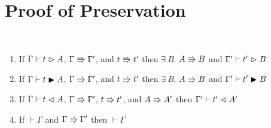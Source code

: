 \chapter{Proof of Preservation}
\label{ap:b}

\begin{lemma}
    \textcolor{white}{\_}
    \begin{enumerate}
        \item If $\Gamma \vdash t \vartriangleright A$, $\Gamma \Rrightarrow \Gamma^\prime$, and $t \Rrightarrow t^\prime$ then $\exists\ B.$ $A \Rrightarrow B$ and $\Gamma^\prime \vdash t^\prime \vartriangleright B$
        \item If $\Gamma \vdash t \blacktriangleright A$, $\Gamma \Rrightarrow \Gamma^\prime$, and $t \Rrightarrow t^\prime$ then $\exists\ B.$ $A \Rrightarrow B$ and $\Gamma^\prime \vdash t^\prime \blacktriangleright B$
        \item If $\Gamma \vdash t \vartriangleleft A$, $\Gamma \Rrightarrow \Gamma^\prime$, $t \Rrightarrow t^\prime$, and $A \Rrightarrow A^\prime$ then $\Gamma^\prime \vdash t^\prime \vartriangleleft A^\prime$
        \item If $\vdash \Gamma$ and $\Gamma \Rrightarrow \Gamma^\prime$ then $\vdash \Gamma^\prime$
    \end{enumerate}
    \label{lem:b:preservation_par_step}
\end{lemma}
